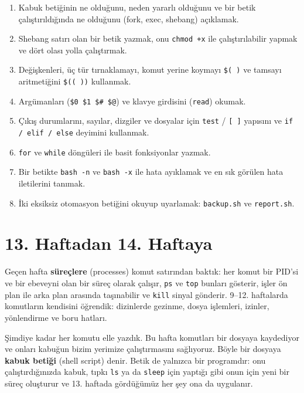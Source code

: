 \documentclass[11pt,a4paper]{article}
\newcommand{\term}[1]{\textbf{\color{mintdeep}#1}}
\newcommand{\cmd}[1]{\texttt{#1}}
\begin{document}
\vspace{0.8em}
\begin{keyidea}
\begin{enumerate}[leftmargin=1.4em]
  \item Kabuk betiğinin ne olduğunu, neden yararlı olduğunu ve bir betik çalıştırıldığında ne olduğunu (fork, exec, shebang) açıklamak.
  \item Shebang satırı olan bir betik yazmak, onu \texttt{chmod +x} ile çalıştırılabilir yapmak ve dört olası yolla çalıştırmak.
  \item Değişkenleri, üç tür tırnaklamayı, komut yerine koymayı \texttt{\$( )} ve tamsayı aritmetiğini \texttt{\$(( ))} kullanmak.
  \item Argümanları (\texttt{\$0 \$1 \$\# \$@}) ve klavye girdisini (\texttt{read}) okumak.
  \item Çıkış durumlarını, sayılar, dizgiler ve dosyalar için \texttt{test} / \texttt{[ ]} yapısını ve \texttt{if / elif / else} deyimini kullanmak.
  \item \texttt{for} ve \texttt{while} döngüleri ile basit fonksiyonlar yazmak.
  \item Bir betikte \texttt{bash -n} ve \texttt{bash -x} ile hata ayıklamak ve en sık görülen hata iletilerini tanımak.
  \item İki eksiksiz otomasyon betiğini okuyup uyarlamak: \texttt{backup.sh} ve \texttt{report.sh}.
\end{enumerate}
\end{keyidea}

\setcounter{tocdepth}{1}
\tableofcontents

\section{13. Haftadan 14. Haftaya}

Geçen hafta \term{süreçlere} (processes) komut satırından baktık: her komut bir PID'si ve bir ebeveyni olan bir süreç olarak çalışır, \cmd{ps} ve \cmd{top} bunları gösterir, işler ön plan ile arka plan arasında taşınabilir ve \cmd{kill} sinyal gönderir. 9--12. haftalarda komutların kendisini öğrendik: dizinlerde gezinme, dosya işlemleri, izinler, yönlendirme ve boru hatları.

Şimdiye kadar her komutu elle yazdık. Bu hafta komutları bir dosyaya kaydediyor ve onları kabuğun bizim yerimize çalıştırmasını sağlıyoruz. Böyle bir dosyaya \term{kabuk betiği} (shell script) denir. Betik de yalnızca bir programdır: onu çalıştırdığınızda kabuk, tıpkı \cmd{ls} ya da \cmd{sleep} için yaptığı gibi onun için yeni bir süreç oluşturur ve 13. haftada gördüğümüz her şey ona da uygulanır.
\end{document}
